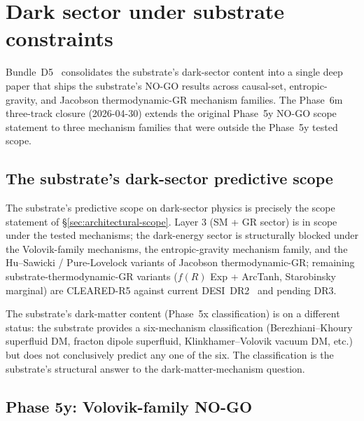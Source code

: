 \documentclass[aps,prd,reprint,nofootinbib,superscriptaddress]{revtex4-2}
\begin{document}

\section{Dark sector under substrate constraints}
\label{sec:dark-sector}

Bundle~D5~\cite{Roehm2026D5} consolidates the substrate's dark-sector
content into a single deep paper that ships the substrate's NO-GO
results across causal-set, entropic-gravity, and Jacobson
thermodynamic-GR mechanism families. The Phase~6m three-track closure
(2026-04-30) extends the original Phase~5y NO-GO scope statement to
three mechanism families that were outside the Phase~5y tested scope.

\subsection{The substrate's dark-sector predictive scope}

The substrate's predictive scope on dark-sector physics is precisely
the scope statement of \S\ref{sec:architectural-scope}. Layer 3
(SM + GR sector) is in scope under the tested mechanisms; the
dark-energy sector is structurally blocked under the Volovik-family
mechanisms, the entropic-gravity mechanism family, and the
Hu--Sawicki / Pure-Lovelock variants of Jacobson thermodynamic-GR;
remaining substrate-thermodynamic-GR variants ($f(R)$ Exp + ArcTanh,
Starobinsky marginal) are CLEARED-R5 against current
DESI~DR2~\cite{Roehm2026D5} and pending DR3.

The substrate's dark-matter content (Phase~5x classification) is on
a different status: the substrate provides a six-mechanism
classification (Berezhiani--Khoury superfluid DM, fracton dipole
superfluid, Klinkhamer--Volovik vacuum DM, etc.) but does not
conclusively predict any one of the six. The classification is the
substrate's structural answer to the dark-matter-mechanism question.

\subsection{Phase 5y: Volovik-family NO-GO}
\end{document}
